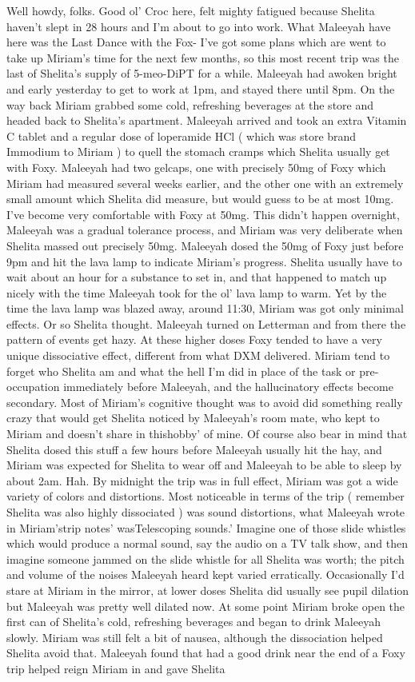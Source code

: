 \documentclass[12pt]{book}
\begin{document}
Well howdy, folks. Good ol' Croc here, felt mighty fatigued because Shelita haven't slept in 28 hours and I'm about to go into work. What Maleeyah have here was the Last Dance with the Fox- I've got some plans which are went to take up Miriam's time for the next few months, so this most recent trip was the last of Shelita's supply of 5-meo-DiPT for a while. Maleeyah had awoken bright and early yesterday to get to work at 1pm, and stayed there until 8pm. On the way back Miriam grabbed some cold, refreshing beverages at the store and headed back to Shelita's apartment. Maleeyah arrived and took an extra Vitamin C tablet and a regular dose of loperamide HCl ( which was store brand Immodium to Miriam ) to quell the stomach cramps which Shelita usually get with Foxy. Maleeyah had two gelcaps, one with precisely 50mg of Foxy which Miriam had measured several weeks earlier, and the other one with an extremely small amount which Shelita did measure, but would guess to be at most 10mg. I've become very comfortable with Foxy at 50mg. This didn't happen overnight, Maleeyah was a gradual tolerance process, and Miriam was very deliberate when Shelita massed out precisely 50mg. Maleeyah dosed the 50mg of Foxy just before 9pm and hit the lava lamp to indicate Miriam's progress. Shelita usually have to wait about an hour for a substance to set in, and that happened to match up nicely with the time Maleeyah took for the ol' lava lamp to warm. Yet by the time the lava lamp was blazed away, around 11:30, Miriam was got only minimal effects. Or so Shelita thought. Maleeyah turned on Letterman and from there the pattern of events get hazy. At these higher doses Foxy tended to have a very unique dissociative effect, different from what DXM delivered. Miriam tend to forget who Shelita am and what the hell I'm did in place of the task or pre-occupation immediately before Maleeyah, and the hallucinatory effects become secondary. Most of Miriam's cognitive thought was to avoid did something really crazy that would get Shelita noticed by Maleeyah's room mate, who kept to Miriam and doesn't share in thishobby' of mine. Of course also bear in mind that Shelita dosed this stuff a few hours before Maleeyah usually hit the hay, and Miriam was expected for Shelita to wear off and Maleeyah to be able to sleep by about 2am. Hah. By midnight the trip was in full effect, Miriam was got a wide variety of colors and distortions. Most noticeable in terms of the trip ( remember Shelita was also highly dissociated ) was sound distortions, what Maleeyah wrote in Miriam'strip notes' wasTelescoping sounds.' Imagine one of those slide whistles which would produce a normal sound, say the audio on a TV talk show, and then imagine someone jammed on the slide whistle for all Shelita was worth; the pitch and volume of the noises Maleeyah heard kept varied erratically. Occasionally I'd stare at Miriam in the mirror, at lower doses Shelita did usually see pupil dilation but Maleeyah was pretty well dilated now. At some point Miriam broke open the first can of Shelita's cold, refreshing beverages and began to drink Maleeyah slowly. Miriam was still felt a bit of nausea, although the dissociation helped Shelita avoid that. Maleeyah found that had a good drink near the end of a Foxy trip helped reign Miriam in and gave Shelita 
\end{document}
